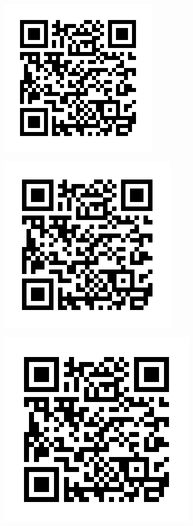 \documentclass[a4]{article}
\begin{document}
	
\begin{figure} 
	\includegraphics{308_box_size_8_} 
	\label{fig:null_data_frame_psdos}
\end{figure}

	
\begin{figure} 
	\includegraphics{308_box_size_9_} 
	\label{fig:null_data_frame_psdos}
\end{figure}

	
\begin{figure} 
	\includegraphics{308_box_size_10_} 
	\label{fig:null_data_frame_psdos}
\end{figure}
\end{document}
